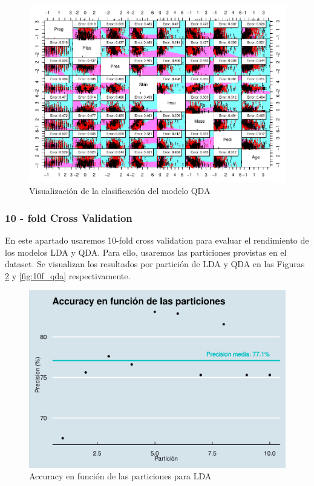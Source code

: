 \documentclass[
]{article}
\begin{document}
\begin{figure}

{\centering \includegraphics[width=1\linewidth]{pima-clasificacion_files/figure-latex/qda-1} 

}

\caption{Visualización de la clasificación del modelo QDA}\label{fig:qda}
\end{figure}

\hypertarget{fold-cross-validation-1}{%
\subsubsection{10 - fold Cross
Validation}\label{fold-cross-validation-1}}

En este apartado usaremos 10-fold cross validation para evaluar el
rendimiento de los modelos LDA y QDA. Para ello, usaremos las
particiones provistas en el dataset. Se visualizan los resultados por
partición de LDA y QDA en las Figuras \ref{fig:10f_lda} y
\ref{fig:10f_qda} respectivamente.

\begin{figure}

{\centering \includegraphics[width=0.5\linewidth]{pima-clasificacion_files/figure-latex/10f_lda-1} 

}

\caption{Accuracy en función de las particiones para LDA}\label{fig:10f_lda}
\end{figure}
\end{document}

